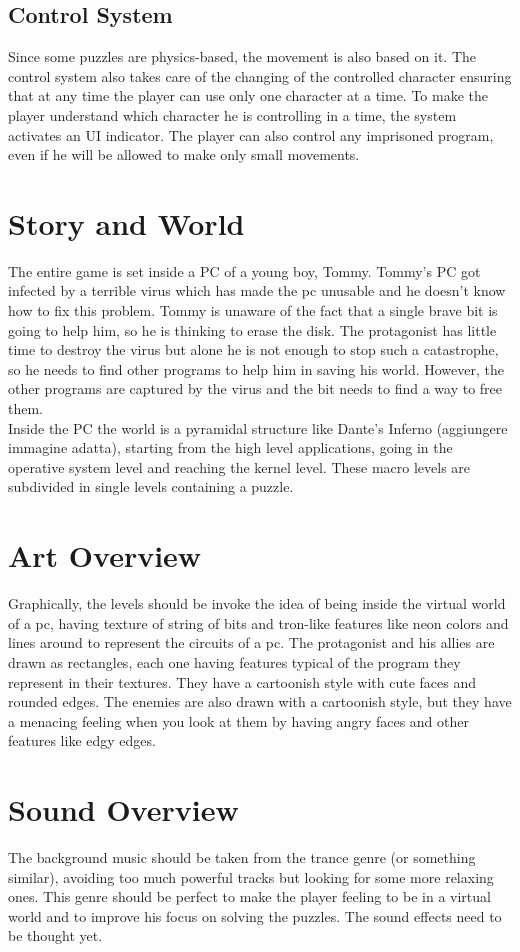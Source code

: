 \documentclass[12pt, a4paper]{report}
\begin{document}
\section*{Control System}
Since some puzzles are physics-based, the movement is also based on it. The control system also takes care of the changing of the controlled character ensuring that at any time the player can use only one character at a time. To make the player understand which character he is controlling in a time, the system activates an UI indicator. The player can also control any imprisoned program, even if he will be allowed to make only small movements.



\chapter{Story and World}
The entire game is set inside a PC of a young boy, Tommy. Tommy’s PC got infected by a terrible virus which has made the pc unusable and he doesn’t know how to fix this problem. Tommy is unaware of the fact that a single brave bit is going to help him, so he is thinking to erase the disk. The protagonist has little time to destroy the virus but alone he is not enough to stop such a catastrophe, so he needs to find other programs to help him in saving his world. However, the other programs are captured by the virus and the bit needs to find a way to free them.\\
Inside the PC the world is a pyramidal structure like Dante’s Inferno (aggiungere immagine adatta), starting from the high level applications, going in the operative system level and reaching the kernel level. These macro levels are subdivided in single levels containing a puzzle.

\chapter{Art Overview}
Graphically, the levels should be invoke the idea of being inside the virtual world of a pc, having texture of string of bits and tron-like features like neon colors and lines around to represent the circuits of a pc.
The protagonist and his allies are drawn as rectangles, each one having features typical of the program they represent in their textures. They have a cartoonish style with cute faces and rounded edges. The enemies are also drawn with a cartoonish style, but they have a menacing feeling when you look at them by having angry faces and other features like edgy edges.

\chapter{Sound Overview}
The background music should be taken from the trance genre (or something similar), avoiding too much powerful tracks but looking for some more relaxing ones. This genre should be perfect to make the player feeling to be in a virtual world and to improve his focus on solving the puzzles.
The sound effects need to be thought yet.
\end{document}
